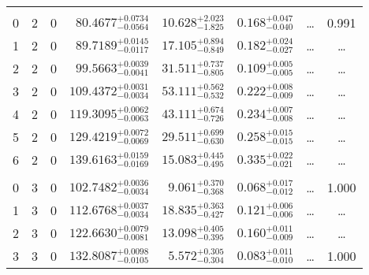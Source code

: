 \begin{table*}[!]
\begin{tabular}{llcrrlrc}
\hline \\[-8pt]
0 & 2 & 0 & $     80.4677_{-      0.0564}^{+      0.0734}$ & $      10.628_{-       1.825}^{+       2.023}$ & $       0.168_{-       0.040}^{+       0.047}$ & \multicolumn{1}{c}{\dots} & 0.991\\[1pt]
1 & 2 & 0 & $     89.7189_{-      0.0117}^{+      0.0145}$ & $      17.105_{-       0.849}^{+       0.894}$ & $       0.182_{-       0.027}^{+       0.024}$ & \multicolumn{1}{c}{\dots} & \dots \\[1pt]
2 & 2 & 0 & $     99.5663_{-      0.0041}^{+      0.0039}$ & $      31.511_{-       0.805}^{+       0.737}$ & $       0.109_{-       0.005}^{+       0.005}$ & \multicolumn{1}{c}{\dots} & \dots \\[1pt]
3 & 2 & 0 & $    109.4372_{-      0.0034}^{+      0.0031}$ & $      53.111_{-       0.532}^{+       0.562}$ & $       0.222_{-       0.009}^{+       0.008}$ & \multicolumn{1}{c}{\dots} & \dots\\[1pt]
4 & 2 & 0 & $    119.3095_{-      0.0063}^{+      0.0062}$ & $      43.111_{-       0.726}^{+       0.674}$ & $       0.234_{-       0.008}^{+       0.007}$ & \multicolumn{1}{c}{\dots} & \dots\\[1pt]
5 & 2 & 0 & $    129.4219_{-      0.0069}^{+      0.0072}$ & $      29.511_{-       0.630}^{+       0.699}$ & $       0.258_{-       0.015}^{+       0.015}$ & \multicolumn{1}{c}{\dots} & \dots \\[1pt]
6 & 2 & 0 & $    139.6163_{-      0.0169}^{+      0.0159}$ & $      15.083_{-       0.495}^{+       0.445}$ & $       0.335_{-       0.021}^{+       0.022}$ & \multicolumn{1}{c}{\dots} & \dots\\[1pt]
\hline \\[-8pt]
0 & 3 & 0 & $    102.7482_{-      0.0034}^{+      0.0036}$ & $       9.061_{-       0.368}^{+       0.370}$ & $       0.068_{-       0.012}^{+       0.017}$ & \multicolumn{1}{c}{\dots} & 1.000\\[1pt]
1 & 3 & 0 & $    112.6768_{-      0.0034}^{+      0.0037}$ & $      18.835_{-       0.427}^{+       0.363}$ & $       0.121_{-       0.006}^{+       0.006}$ & \multicolumn{1}{c}{\dots} & \dots\\[1pt]
2 & 3 & 0 & $    122.6630_{-      0.0081}^{+      0.0079}$ & $      13.098_{-       0.395}^{+       0.405}$ & $       0.160_{-       0.009}^{+       0.011}$ & \multicolumn{1}{c}{\dots} & \dots \\[1pt]
3 & 3 & 0 & $    132.8087_{-      0.0105}^{+      0.0098}$ & $       5.572_{-       0.304}^{+       0.305}$ & $       0.083_{-       0.010}^{+       0.011}$ & \multicolumn{1}{c}{\dots} & 1.000\\[1pt]
\hline
\end{tabular}
\end{table*}